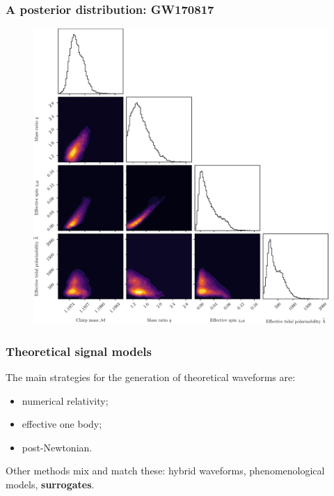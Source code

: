 \documentclass{beamer}
\begin{document}
\begin{frame}
    \frametitle{A posterior distribution: GW170817}
    \begin{figure}[ht]
    \vspace{-.2cm}
    \centering
    \includegraphics[width=.7\textwidth]{figures/corner_posterior}
    \label{fig:corner_posterior}
    \end{figure}
\end{frame}

\begin{frame}
    \frametitle{Theoretical signal models}
    The main strategies for the generation of theoretical waveforms are: 
    \begin{itemize}
        \item numerical relativity;
        \item effective one body;
        \item post-Newtonian.
    \end{itemize}

    Other methods mix and match these: hybrid waveforms, phenomenological models, 
    \textbf{surrogates}.
\end{frame}
\end{document}

